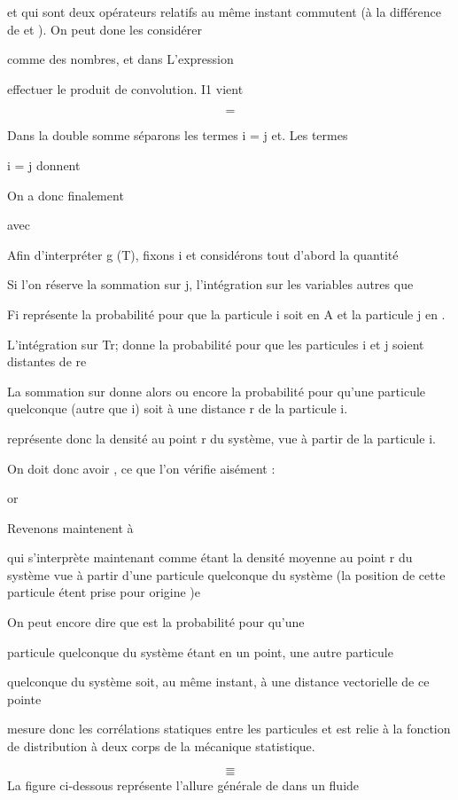 {{{ et  qui sont deux opérateurs relatifs au même instant
commutent (à la différence de  et ). On peut done les considérer

comme des nombres, et dans L'expression

effectuer le produit de convolution. I1 vient

\[
\tag{136}=
\]


Dans la double somme séparons les termes i = j et. Les termes

i = j donnent

On a donc finalement

avec

Afin d'interpréter g (T), fixons i et considérons tout d'abord la quantité

Si l'on réserve la sommation sur j, l'intégration sur les variables autres que

Fi représente la probabilité pour que la particule i soit en A et la particule
j en  .

L'intégration sur Tr; donne la probabilité pour que les particules
i et j soient distantes de re

La sommation sur  donne alors  ou encore la probabilité
pour qu'une particule quelconque (autre que i) soit à une distance r de la
particule i.


 représente donc la densité au point r du système, vue à partir de
la particule i.

On doit donc avoir , ce que l'on vérifie
aisément :

or

Revenons maintenent à 

qui s'interprète maintenant comme étant la densité moyenne au point r du
système vue à partir d'une particule quelconque du système (la position de
cette particule étent prise pour origine )e

On peut encore dire que  est la probabilité pour qu'une

particule quelconque du système étant en un point, une autre particule

quelconque du système soit, au même instant, à une distance vectorielle
de ce pointe

 mesure donc les corrélations statiques entre les particules et est relie
à la fonction de distribution à deux corps de la mécanique statistique.

\[
\tag{137}=
\]
\[
\tag{138}=
\]
La figure ci-dessous représente l'allure générale de  dans un fluide

}}}
